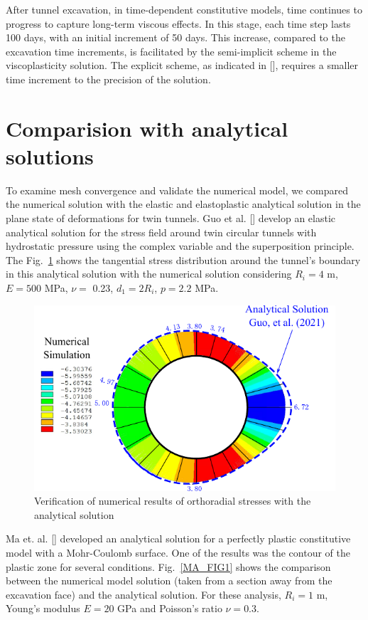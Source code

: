 \documentclass[a4paper,fleqn]{cas-sc}
\begin{document}
After tunnel excavation, in time-dependent constitutive models, time continues to progress to capture long-term viscous effects. In this stage, each time step lasts 100 days, with an initial increment of 50 days. This increase, compared to the excavation time increments, is facilitated by the semi-implicit scheme in the viscoplasticity solution. The explicit scheme, as indicated in [], requires a smaller time increment to the precision of the solution.

\section{Comparision with analytical solutions}\label{}

To examine mesh convergence and validate the numerical model, we compared the numerical solution with the elastic and elastoplastic analytical solution in the plane state of deformations for twin tunnels. Guo et al. [] develop an elastic analytical solution for the stress field around twin circular tunnels with hydrostatic pressure using the complex variable and the superposition principle. The Fig.~\ref{GUO_FIG1} shows the tangential stress distribution around the tunnel's boundary in this analytical solution with the numerical solution considering  $R_i = 4$ m, $E = 500$ MPa, $\nu =$ 0.23, $d_1 = 2R_i$, $p = 2.2$ MPa.
\begin{figure}[h!]
	\centering
	\includegraphics[scale=1]{GUO_FIG1.pdf}
	\caption{Verification of numerical results of orthoradial stresses with the analytical solution}
	\label{GUO_FIG1}
\end{figure}
\FloatBarrier
Ma et. al. [] developed an analytical solution for a perfectly plastic constitutive model with a Mohr-Coulomb surface. One of the results was the contour of the plastic zone for several conditions. Fig.~\ref{MA_FIG1} shows the comparison between the numerical model solution (taken from a section away from the excavation face) and the analytical solution. For these analysis, $R_i = 1$ m, Young's modulus $E=20$ GPa and Poisson's ratio $\nu = 0.3$.
\end{document}

